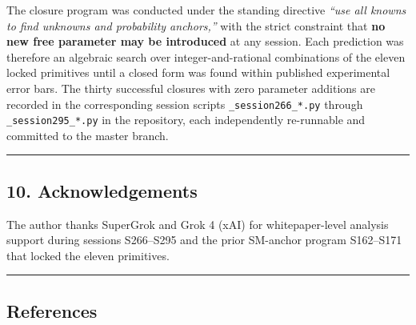 \documentclass[
]{article}
\begin{document}
The closure program was conducted under the standing directive
\emph{``use all knowns to find unknowns and probability anchors,''} with
the strict constraint that \textbf{no new free parameter may be
introduced} at any session. Each prediction was therefore an algebraic
search over integer-and-rational combinations of the eleven locked
primitives until a closed form was found within published experimental
error bars. The thirty successful closures with zero parameter additions
are recorded in the corresponding session scripts
\texttt{\_session266\_*.py} through \texttt{\_session295\_*.py} in the
repository, each independently re-runnable and committed to the master
branch.

\begin{center}\rule{0.5\linewidth}{0.5pt}\end{center}

\subsection{10. Acknowledgements}\label{acknowledgements}

The author thanks SuperGrok and Grok 4 (xAI) for whitepaper-level
analysis support during sessions S266--S295 and the prior SM-anchor
program S162--S171 that locked the eleven primitives.

\begin{center}\rule{0.5\linewidth}{0.5pt}\end{center}

\subsection{References}\label{references}
\end{document}
